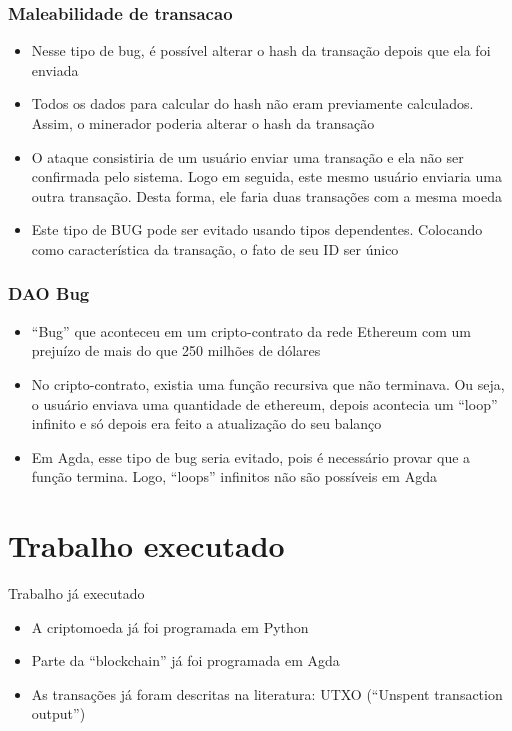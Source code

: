 \documentclass{beamer}
\begin{document}
 \begin{frame}
   \frametitle{Maleabilidade de transacao}
\begin{itemize}
  \item Nesse tipo de bug, é possível alterar o hash da transação depois que ela foi enviada
  \item Todos os dados para calcular do hash não eram previamente calculados. Assim, o minerador poderia alterar o hash da transação
  \item O ataque consistiria de um usuário enviar uma transação e ela não ser confirmada pelo sistema.
    Logo em seguida, este mesmo usuário enviaria uma outra transação. Desta forma, ele faria duas transações com a mesma moeda
  \item Este tipo de BUG pode ser evitado usando tipos dependentes. Colocando como característica da transação, o fato de seu ID ser único
\end{itemize}
\end{frame}

\begin{frame}
  \frametitle{DAO Bug}
  \begin{itemize}
    \item \foreignquote{english}{Bug} que aconteceu em um cripto-contrato da rede Ethereum com um prejuízo de mais do que 250 milhões de dólares
      \cite{wood2014ethereum}
    \item No cripto-contrato, existia uma função recursiva que não terminava. Ou seja, o usuário enviava uma quantidade de ethereum, depois acontecia um \foreignquote{english}{loop} infinito e só depois era feito a atualização do seu balanço
    \item Em Agda, esse tipo de bug seria evitado, pois é necessário provar que a função termina. Logo, \foreignquote{english}{loops} infinitos não são possíveis em Agda
  \end{itemize}
\end{frame}

\section{Trabalho executado}

\begin{frame}{Trabalho já executado}
  \begin{itemize}
    \item A criptomoeda já foi programada em Python
    \item Parte da \foreignquote{english}{blockchain} já foi programada em Agda
    \item As transações já foram descritas na literatura: UTXO (\foreignquote{english}{Unspent transaction output}) \\
      \cite{setzer2018modelling}
  \end{itemize}
\end{frame}
\end{document}
